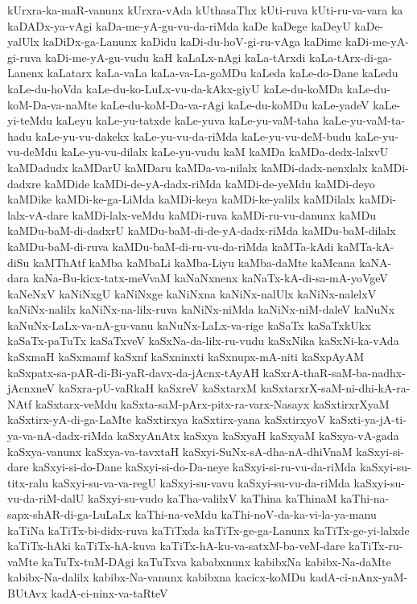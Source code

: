 {kUrxra-ka-maR-vanunx
kUrxra-vAda
kUthasaThx
kUti-ruva
kUti-ru-va-vara
ka
kaDADx-ya-vAgi
kaDa-me-yA-gu-vu-da-riMda
kaDe
kaDege
kaDeyU
kaDe-yalUlx
kaDiDx-ga-Lanunx
kaDidu
kaDi-du-hoV-gi-ru-vAga
kaDime
kaDi-me-yA-gi-ruva
kaDi-me-yA-gu-vudu
kaH
kaLaLx-nAgi
kaLa-tArxdi
kaLa-tArx-di-ga-Lanenx
kaLatarx
kaLa-vaLa
kaLa-va-La-goMDu
kaLeda
kaLe-do-Dane
kaLedu
kaLe-du-hoVda
kaLe-du-ko-LuLx-vu-da-kAkx-giyU
kaLe-du-koMDa
kaLe-du-koM-Da-va-naMte
kaLe-du-koM-Da-va-rAgi
kaLe-du-koMDu
kaLe-yadeV
kaLe-yi-teMdu
kaLeyu
kaLe-yu-tatxde
kaLe-yuva
kaLe-yu-vaM-taha
kaLe-yu-vaM-ta-hadu
kaLe-yu-vu-dakekx
kaLe-yu-vu-da-riMda
kaLe-yu-vu-deM-budu
kaLe-yu-vu-deMdu
kaLe-yu-vu-dilalx
kaLe-yu-vudu
kaM
kaMDa
kaMDa-dedx-lalxvU
kaMDadudx
kaMDarU
kaMDaru
kaMDa-va-nilalx
kaMDi-dadx-nenxlalx
kaMDi-dadxre
kaMDide
kaMDi-de-yA-dadx-riMda
kaMDi-de-yeMdu
kaMDi-deyo
kaMDike
kaMDi-ke-ga-LiMda
kaMDi-keya
kaMDi-ke-yalilx
kaMDilalx
kaMDi-lalx-vA-dare
kaMDi-lalx-veMdu
kaMDi-ruva
kaMDi-ru-vu-danunx
kaMDu
kaMDu-baM-di-dadxrU
kaMDu-baM-di-de-yA-dadx-riMda
kaMDu-baM-dilalx
kaMDu-baM-di-ruva
kaMDu-baM-di-ru-vu-da-riMda
kaMTa-kAdi
kaMTa-kA-diSu
kaMThAtf
kaMba
kaMbaLi
kaMba-Liyu
kaMba-daMte
kaMcana
kaNA-dara
kaNa-Bu-kicx-tatx-meVvaM
kaNaNxnenx
kaNaTx-kA-di-sa-mA-yoVgeV
kaNeNxV
kaNiNxgU
kaNiNxge
kaNiNxna
kaNiNx-nalUlx
kaNiNx-nalelxV
kaNiNx-nalilx
kaNiNx-na-lilx-ruva
kaNiNx-niMda
kaNiNx-niM-daleV
kaNuNx
kaNuNx-LaLx-va-nA-gu-vanu
kaNuNx-LaLx-va-rige
kaSaTx
kaSaTxkUkx
kaSaTx-paTuTx
kaSaTxveV
kaSxNa-da-lilx-ru-vudu
kaSxNika
kaSxNi-ka-vAda
kaSxmaH
kaSxmamf
kaSxnf
kaSxninxti
kaSxnupx-mA-niti
kaSxpAyAM
kaSxpatx-sa-pAR-di-Bi-yaR-davx-da-jAcnx-tAyAH
kaSxrA-thaR-saM-ba-nadhx-jAcnxneV
kaSxra-pU-vaRkaH
kaSxreV
kaSxtarxM
kaSxtarxrX-saM-ni-dhi-kA-ra-NAtf
kaSxtarx-veMdu
kaSxta-saM-pArx-pitx-ra-varx-Nasayx
kaSxtirxrXyaM
kaSxtirx-yA-di-ga-LaMte
kaSxtirxya
kaSxtirx-yana
kaSxtirxyoV
kaSxti-ya-jA-ti-ya-va-nA-dadx-riMda
kaSxyAnAtx
kaSxya
kaSxyaH
kaSxyaM
kaSxya-vA-gada
kaSxya-vanunx
kaSxya-va-tavxtaH
kaSxyi-SuNx-sA-dha-nA-dhiVnaM
kaSxyi-si-dare
kaSxyi-si-do-Dane
kaSxyi-si-do-Da-neye
kaSxyi-si-ru-vu-da-riMda
kaSxyi-su-titx-ralu
kaSxyi-su-va-va-regU
kaSxyi-su-vavu
kaSxyi-su-vu-da-riMda
kaSxyi-su-vu-da-riM-dalU
kaSxyi-su-vudo
kaTha-valilxV
kaThina
kaThinaM
kaThi-na-sapx-shAR-di-ga-LuLaLx
kaThi-na-veMdu
kaThi-noV-da-ka-vi-la-ya-manu
kaTiNa
kaTiTx-bi-didx-ruva
kaTiTxda
kaTiTx-ge-ga-Lanunx
kaTiTx-ge-yi-lalxde
kaTiTx-hAki
kaTiTx-hA-kuva
kaTiTx-hA-ku-va-satxM-ba-veM-dare
kaTiTx-ru-vaMte
kaTuTx-tuM-DAgi
kaTuTxva
kababxnunx
kabibxNa
kabibx-Na-daMte
kabibx-Na-dalilx
kabibx-Na-vanunx
kabibxna
kacicx-koMDu
kadA-ci-nAnx-yaM-BUtAvx
kadA-ci-ninx-va-taRteV
}
